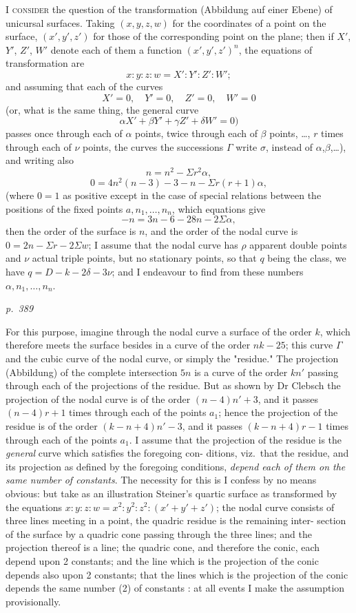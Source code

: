 \documentclass[11pt,a4paper]{article}
\theoremstyle{plain}
\theoremstyle{definition}
\begin{document}
\noindent
\textsc{I consider} the question of the transformation (Abbildung auf einer Ebene) of
unicursal surfaces.  Taking $(x, y, z, w)$ for the coordinates of a point on the surface,
$(x', y', z')$ for those of the corresponding point on the plane; then if $X'$, $Y'$, $Z'$, $W'$
denote each of them a function $(x', y', z')^n$, the equations of transformation are
\[
x : y : z : w = X' : Y' : Z' : W';
\]
and assuming that each of the curves
\[
X' = 0, \quad Y' = 0, \quad Z' = 0, \quad W' = 0
\]
(or, what is the same thing, the general curve
\[
\alpha X' + \beta Y' + \gamma Z' + \delta W' = 0)
\]
passes once through each of $\alpha$ points, twice through each of $\beta$ points, \ldots, $r$ times
through each of $\nu$ points, the curves the successions $\Gamma$ write $\sigma$, instead of $\alpha$,$\beta$,\ldots), and writing also
\[
n = n^2 - \Sigma r^2 \alpha,
\]
\[
0 = 4n^2(n - 3) - 3 - n - \Sigma r(r + 1)\alpha,
\]
(where $0 = 1$ as positive except in the case of special relations between the positions
of the fixed points $a, n_1, \ldots, n_n$, which equations give
\[
-n = 3n - 6 - 28n - 2\Sigma\alpha,
\]
then the order of the surface is $n$, and the order of the nodal curve is $0 = 2 n - \Sigma r - 2 \Sigma w$;
I assume that the nodal curve has $\rho$ apparent double points and $\nu$ actual triple points,
but no stationary points, so that $q$ being the class, we have $q = D - k - 2 \delta - 3 \nu$; and
I endeavour to find from these numbers $\alpha, n_1, \ldots, n_n$.

\clearpage

\bigskip
\textit{p.~389}
\smallskip

\noindent
For this purpose, imagine through the nodal curve a surface of the order $k$, which
therefore meets the surface besides in a curve of the order $n k - 25$; this curve $\Gamma$ and
the cubic curve of the nodal curve, or simply the "residue."  The projection (Abbildung) of
the complete intersection $5n$ is a curve of the order $kn'$ passing through each
of the projections of the residue.  But as shown by Dr Clebsch the projection of the
nodal curve is of the order $(n - 4)n' + 3$, and it passes $(n - 4)r + 1$ times through each
of the points $a_1$; hence the projection of the residue is of the order $(k - n + 4)n' - 3$,
and it passes $(k - n + 4)r - 1$ times through each of the points $a_1$.  I assume that
the projection of the residue is the \textit{general} curve which satisfies the foregoing con-
ditions, viz.\ that the residue, and its projection as defined by the foregoing conditions,
\textit{depend each of them on the same number of constants}.  The necessity for this is I
confess by no means obvious: but take as an illustration Steiner's quartic surface as
transformed by the equations $x : y : z : w = x^2 : y^2 : z^2 : (x' + y' + z')$; the nodal curve
consists of three lines meeting in a point, the quadric residue is the remaining inter-
section of the surface by a quadric cone passing through the three lines; and the
projection thereof is a line; the quadric cone, and therefore the conic, each depend
upon 2 constants; and the line which is the projection of the conic depends also
upon 2 constants; that the lines which is the projection of the conic depends
the same number (2) of constants : at all events I make the assumption provisionally.
\end{document}
